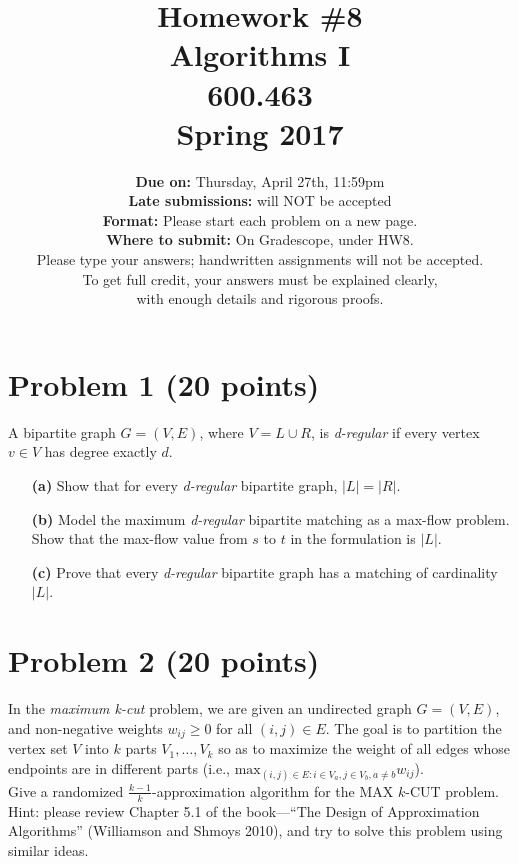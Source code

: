 \documentclass[letterpaper, 11pt]{article}
\begin{document}
\title{Homework \#8 \\ Algorithms I \\ 600.463 \\Spring 2017}
\author{\textbf{Due on:} Thursday, April 27th, 11:59pm \\
\textbf{Late submissions:} will NOT be accepted\\
\textbf{Format:} Please start each problem on a new page.
\\\textbf{Where to submit:} On Gradescope, under HW8.
\\ Please type your answers; handwritten assignments will not be accepted.
\\ To get full credit, your answers must be explained clearly,\\ with enough details
and rigorous proofs.
\\}

\maketitle


\section{Problem 1 (20 points)}

A bipartite graph $G=(V,E)$, where $V = L \cup R$, is \textit{d-regular} if every vertex $v \in V$ has degree exactly $d$.  
\begin{itemize}
\item[\textbf{(a)}] Show that for every \textit{d-regular} bipartite graph, $|L|=|R|$.
\item[\textbf{(b)}] Model the maximum \textit{d-regular} bipartite matching as a max-flow problem. Show that the max-flow value from $s$ to $t$ in the formulation is $|L|$.
\item[\textbf{(c)}] Prove that every \textit{d-regular} bipartite graph has a matching of cardinality $|L|$.

\end{itemize}

\section{Problem 2 (20 points)}
In the \textit{maximum k-cut} problem, we are given an undirected graph $G=(V,E)$, and non-negative weights $w_{ij} \ge 0$ for all $(i,j) \in E$. The goal is to partition the vertex set $V$ into $k$ parts $V_1, \dots, V_k$ so as to maximize the weight of all edges whose endpoints are in different parts (i.e., $\text{max}_{(i,j)\in E:i \in V_a, j\in V_b, a\ne b}w_{ij}$).\\
Give a randomized $\frac{k-1}{k}$-approximation algorithm for the MAX $k$-CUT problem.\\
Hint: please review Chapter 5.1 of the book---``The Design of Approximation Algorithms'' (Williamson and Shmoys 2010), and try to solve this problem using similar ideas.
\end{document}

